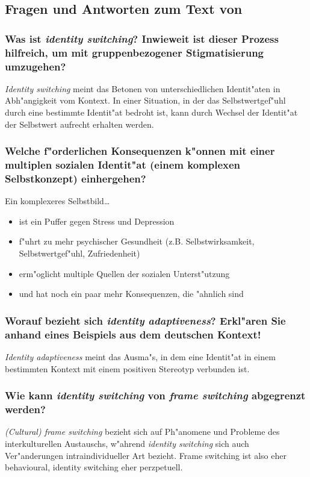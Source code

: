 \subsection{Fragen und Antworten zum Text von \textcite{shih_costs_2010}}
\subsubsection{Was ist \emph{identity switching}? Inwieweit ist dieser Prozess hilfreich, um mit gruppenbezogener Stigmatisierung umzugehen?}
\emph{Identity switching} meint das Betonen von unterschiedlichen Identit"aten in Abh"angigkeit vom Kontext. In einer Situation, in der das Selbstwertgef"uhl durch eine bestimmte Identit"at bedroht ist, kann durch Wechsel der Identit"at der Selbstwert aufrecht erhalten werden.

\subsubsection{Welche f"orderlichen Konsequenzen k"onnen mit einer multiplen sozialen Identit"at (einem komplexen Selbstkonzept) einhergehen?}
Ein komplexeres Selbstbild\ldots
\begin{itemize}
        \item ist ein Puffer gegen Stress und Depression
        \item f"uhrt zu mehr psychischer Gesundheit (z.B. Selbstwirksamkeit, Selbstwertgef"uhl, Zufriedenheit)
        \item erm"oglicht multiple Quellen der sozialen Unterst"utzung
        \item und hat noch ein paar mehr Konsequenzen, die "ahnlich sind
\end{itemize}

\subsubsection{Worauf bezieht sich \emph{identity adaptiveness}? Erkl"aren Sie anhand eines Beispiels aus dem deutschen Kontext!}
\emph{Identity adaptiveness} meint das Ausma"s, in dem eine Identit"at in einem bestimmten Kontext mit einem positiven Stereotyp verbunden ist.

\subsubsection{Wie kann \emph{identity switching} von \emph{frame switching} abgegrenzt werden?}
\emph{(Cultural) frame switching} bezieht sich auf Ph"anomene und Probleme des interkulturellen Austauschs, w"ahrend \emph{identity switching} sich auch Ver"anderungen intraindividueller Art bezieht. Frame switching ist also eher behavioural, identity switching eher perzpetuell.

